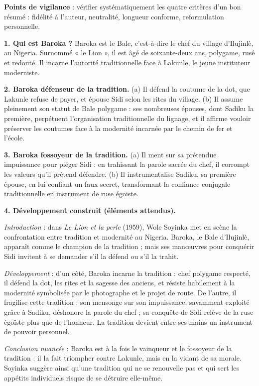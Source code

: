 \documentclass[11pt]{article}
\begin{document}
\begin{corrige}
\textbf{Points de vigilance} : vérifier systématiquement les quatre critères d'un bon résumé : fidélité à l'auteur, neutralité, longueur conforme, reformulation personnelle.
\end{corrige}

\begin{corrige}
\textbf{1. Qui est Baroka ?} Baroka est le Bale, c'est-à-dire le chef du village d'Ilujinlè, au Nigeria. Surnommé « le Lion », il est âgé de soixante-deux ans, polygame, rusé et redouté. Il incarne l'autorité traditionnelle face à Lakunle, le jeune instituteur moderniste.

\textbf{2. Baroka défenseur de la tradition.} (a) Il défend la coutume de la dot, que Lakunle refuse de payer, et épouse Sidi selon les rites du village. (b) Il assume pleinement son statut de Bale polygame : ses nombreuses épouses, dont Sadiku la première, perpétuent l'organisation traditionnelle du lignage, et il affirme vouloir préserver les coutumes face à la modernité incarnée par le chemin de fer et l'école.

\textbf{3. Baroka fossoyeur de la tradition.} (a) Il ment sur sa prétendue impuissance pour piéger Sidi : en trahissant la parole sacrée du chef, il corrompt les valeurs qu'il prétend défendre. (b) Il instrumentalise Sadiku, sa première épouse, en lui confiant un faux secret, transformant la confiance conjugale traditionnelle en instrument de ruse égoïste.

\textbf{4. Développement construit (éléments attendus).}

\emph{Introduction} : dans \emph{Le Lion et la perle} (1959), Wole Soyinka met en scène la confrontation entre tradition et modernité au Nigeria. Baroka, le Bale d'Ilujinlè, apparaît comme le champion de la tradition ; mais ses manœuvres pour conquérir Sidi invitent à se demander s'il la défend ou s'il la trahit.

\emph{Développement} : d'un côté, Baroka incarne la tradition : chef polygame respecté, il défend la dot, les rites et la sagesse des anciens, et résiste habilement à la modernité symbolisée par le photographe et le projet de route. De l'autre, il fragilise cette tradition : son mensonge sur son impuissance, savamment exploité grâce à Sadiku, déshonore la parole du chef ; sa conquête de Sidi relève de la ruse égoïste plus que de l'honneur. La tradition devient entre ses mains un instrument de pouvoir personnel.

\emph{Conclusion nuancée} : Baroka est à la fois le vainqueur et le fossoyeur de la tradition : il la fait triompher contre Lakunle, mais en la vidant de sa morale. Soyinka suggère ainsi qu'une tradition qui ne se renouvelle pas et qui sert les appétits individuels risque de se détruire elle-même.


\end{corrige}
\end{document}
